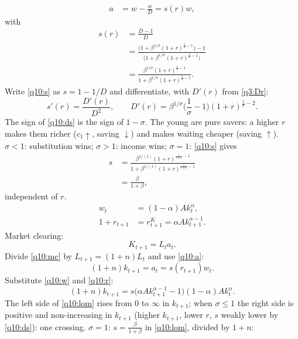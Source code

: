 \begin{sol}
\begin{align}
a &= w-\frac wD=s(r)w, \label{q10:a}
\end{align}
with
\begin{align}
s(r) &= \frac{D-1}{D}\nonumber\\
&= \frac{\big(1+\beta^{1/\sigma}(1+r)^{\frac1\sigma-1}\big)-1}{\big(1+\beta^{1/\sigma}(1+r)^{\frac1\sigma-1}\big)}\nonumber\\
&= \frac{\beta^{1/\sigma}(1+r)^{\frac1\sigma-1}}{1+\beta^{1/\sigma}(1+r)^{\frac1\sigma-1}}. \label{q10:s}
\end{align}
Write \eqref{q10:s} as $s=1-1/D$ and differentiate, with $D'(r)$ from \eqref{q3:Dr}:
\begin{equation}
s'(r)=\frac{D'(r)}{D^2},\qquad D'(r)=\beta^{1/\sigma}\Big(\frac1\sigma-1\Big)(1+r)^{\frac1\sigma-2}. \label{q10:ds}
\end{equation}
The sign of \eqref{q10:ds} is the sign of $1-\sigma$. The young are pure savers: a higher $r$ makes them richer ($c_1\uparrow$, saving
$\downarrow$) and makes waiting cheaper (saving $\uparrow$). $\sigma<1$: substitution wins; $\sigma>1$: income wins; $\sigma=1$:
\eqref{q10:s} gives
\begin{align*}
s &= \frac{\beta^{1/(1)}(1+r)^{\frac1{(1)}-1}}{1+\beta^{1/(1)}(1+r)^{\frac1{(1)}-1}}\\
&= \frac\beta{1+\beta},
\end{align*}
independent of $r$.
\begin{align}
w_t &= (1-\alpha)Ak_t^\alpha, \label{q10:w}\\
1+r_{t+1} &= r^K_{t+1}=\alpha Ak_{t+1}^{\alpha-1}. \label{q10:r}
\end{align}
Market clearing:
\begin{equation}
K_{t+1}=L_ta_t. \label{q10:mc}
\end{equation}
Divide \eqref{q10:mc} by $L_{t+1}=(1+n)L_t$ and use \eqref{q10:a}:
\[
(1+n)k_{t+1}=a_t=s(r_{t+1})w_t .
\]
Substitute \eqref{q10:w} and \eqref{q10:r}:
\begin{equation}
(1+n)k_{t+1}=s\big(\alpha Ak_{t+1}^{\alpha-1}-1\big)(1-\alpha)Ak_t^\alpha. \label{q10:lom}
\end{equation}
The left side of \eqref{q10:lom} rises from 0 to $\infty$ in $k_{t+1}$; when $\sigma\le1$ the right side is positive and non-increasing in
$k_{t+1}$ (higher $k_{t+1}$, lower $r$, $s$ weakly lower by \eqref{q10:ds}): one crossing. $\sigma=1$: $s=\frac\beta{1+\beta}$ in
\eqref{q10:lom}, divided by $1+n$:
\begin{align}

\end{align}
\end{sol}
